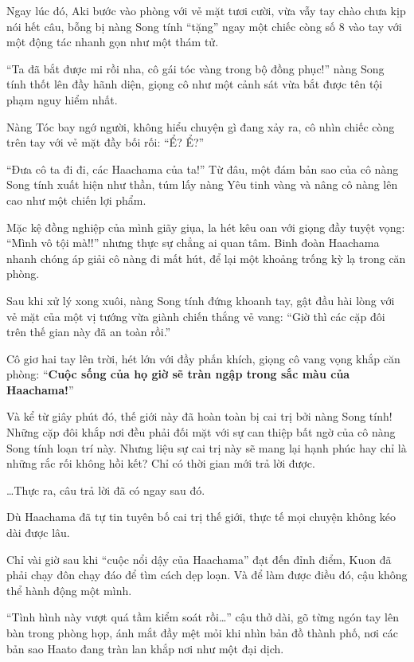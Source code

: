 \documentclass[../main.tex]{subfiles}
\begin{document}
Ngay lúc đó, Aki bước vào phòng với vẻ mặt tươi cười, vừa vẫy tay chào chưa kịp nói hết câu, bỗng bị nàng Song tính ``tặng'' ngay một chiếc còng số 8 vào tay với một động tác nhanh gọn như một thám tử.


``Ta đã bắt được mi rồi nha, cô gái tóc vàng trong bộ đồng phục!'' nàng Song tính thốt lên đầy hãnh diện, giọng cô như một cảnh sát vừa bắt được tên tội phạm nguy hiểm nhất.

Nàng Tóc bay ngớ người, không hiểu chuyện gì đang xảy ra, cô nhìn chiếc còng trên tay với vẻ mặt đầy bối rối: ``Ể? Ể?''

``Đưa cô ta đi đi, các Haachama của ta!'' Từ đâu, một đám bản sao của cô nàng Song tính xuất hiện như thần, túm lấy nàng Yêu tinh vàng và nâng cô nàng lên cao như một chiến lợi phẩm.

Mặc kệ đồng nghiệp của mình giãy giụa, la hét kêu oan với giọng đầy tuyệt vọng: ``Mình vô tội mà!!'' nhưng thực sự chẳng ai quan tâm. Binh đoàn Haachama nhanh chóng áp giải cô nàng đi mất hút, để lại một khoảng trống kỳ lạ trong căn phòng.

Sau khi xử lý xong xuôi, nàng Song tính đứng khoanh tay, gật đầu hài lòng với vẻ mặt của một vị tướng vừa giành chiến thắng vẻ vang: ``Giờ thì các cặp đôi trên thế gian này đã an toàn rồi.''

Cô giơ hai tay lên trời, hét lớn với đầy phấn khích, giọng cô vang vọng khắp căn phòng: ``\textbf{Cuộc sống của họ giờ sẽ tràn ngập trong sắc màu của Haachama!}''


Và kể từ giây phút đó, thế giới này đã hoàn toàn bị cai trị bởi nàng Song tính! Những cặp đôi khắp nơi đều phải đối mặt với sự can thiệp bất ngờ của cô nàng Song tính loạn trí này. Nhưng liệu sự cai trị này sẽ mang lại hạnh phúc hay chỉ là những rắc rối không hồi kết? Chỉ có thời gian mới trả lời được.

\omk

\dots Thực ra, câu trả lời đã có ngay sau đó.

Dù Haachama đã tự tin tuyên bố cai trị thế giới, thực tế mọi chuyện không kéo dài được lâu.

Chỉ vài giờ sau khi ``cuộc nổi dậy của Haachama'' đạt đến đỉnh điểm, Kuon đã phải chạy đôn chạy đáo để tìm cách dẹp loạn. Và để làm được điều đó, cậu không thể hành động một mình.

``Tình hình này vượt quá tầm kiểm soát rồi\dots'' cậu thở dài, gõ từng ngón tay lên bàn trong phòng họp, ánh mắt đầy mệt mỏi khi nhìn bản đồ thành phố, nơi các bản sao Haato đang tràn lan khắp nơi như một đại dịch.
\end{document}
